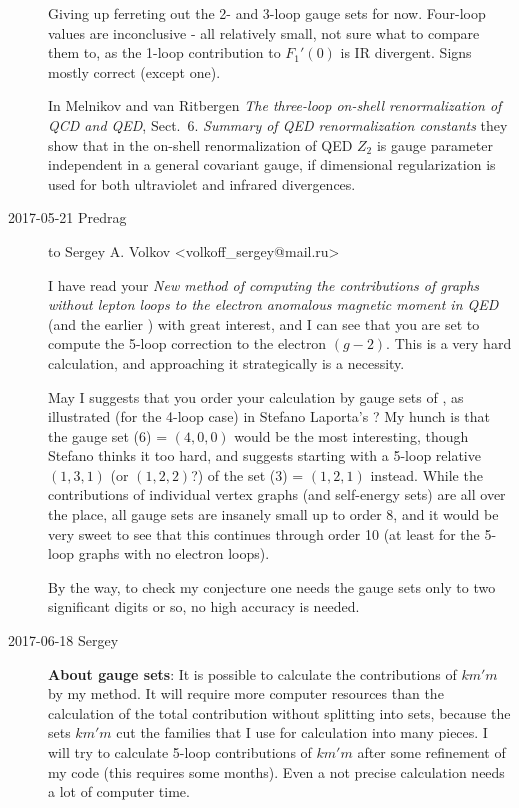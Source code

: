 \begin{description}
Giving up ferreting out the 2- and 3-loop gauge sets for now. Four-loop
values are inconclusive - all relatively small, not sure what to
compare them to, as the 1-loop contribution to $F_1'(0)$ is IR divergent.
Signs mostly correct (except one).

In Melnikov and van Ritbergen
 {\em The three-loop on-shell renormalization of {QCD} and {QED}},
 Sect.~6.  {\em Summary of QED renormalization constants} they show that
 in the on-shell renormalization of QED $Z_2$ is gauge parameter
 independent in a general covariant gauge, if dimensional regularization
 is used for both ultraviolet and infrared divergences.

\item[2017-05-21 Predrag] to
Sergey  A. Volkov <volkoff\_sergey@mail.ru>
%

I have read your
{\em New method of computing the contributions of graphs without lepton
loops to the electron anomalous magnetic moment in {QED}}
(and the earlier ) with great interest, and I can see
that you are set to compute the 5-loop correction to the electron
$(g-2)$. This is a very hard calculation, and approaching it
strategically is a necessity.

May I suggests that you order your calculation by gauge sets of
, as illustrated (for the 4-loop case) in Stefano
Laporta's ? My hunch is that the gauge
set (6) = $(4,0,0)$ would be the most interesting, though Stefano thinks
it too hard, and suggests starting with a 5-loop relative $(1,3,1)$ (or
$(1,2,2)$?) of the set (3) = $(1,2,1)$ instead. While the contributions
of individual vertex graphs (and self-energy sets) are all
over the place, all gauge sets are insanely small up to order
8, and it would be very sweet to see that this continues through order 10
(at least for the 5-loop graphs with no electron loops).

By the way, to check my conjecture one needs the gauge sets only to two
significant digits or so, no high accuracy is needed.

\item[2017-06-18 Sergey]
\textbf{About gauge sets}:
It is possible to calculate the contributions of $km'm$ by my
method. It will require more computer resources than the calculation of
the total contribution without splitting into sets, because the sets
$km'm$ cut the families that I use for calculation into many pieces.
I will try to calculate 5-loop contributions of $km'm$ after
some refinement of my code (this requires some months). Even a not
precise calculation needs a lot of computer time.


\end{description}
